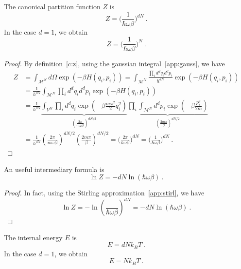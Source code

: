     The canonical partition function $Z$ is 
    \begin{equation}\label{harmz}
        Z = \Big (\frac{1}{\hbar \omega \beta} \Big )^{dN} ~.
    \end{equation}
    In the case $d = 1$, we obtain
    \begin{equation*}
        Z = \Big (\frac{1}{\hbar \omega \beta} \Big )^{N} ~.
    \end{equation*}
    \begin{proof}
        By definition~\eqref{c:z}, using the gaussian integral~\eqref{app:gauss}, we have
        \begin{equation*}
        \begin{aligned}
            Z & = \int_{\mathcal M^N} d\Omega \exp(- \beta H (q_i, p_i)) = \int_{\mathcal M^N} \frac{\prod_i d^d q_i d^d p_i}{h^{dN} } \exp(- \beta H (q_i, p_i)) \\ & = \frac{1}{h^{dN} } \int_{\mathcal M^N} \prod_i d^d q_i d^d p_i \exp(- \beta H (q_i, p_i)) \\ & = \frac{1}{h^{dN} } \underbrace{\int_{ V^N} \prod_i d^d q_i \exp(- \beta \frac{m \omega^2}{2} q_i^2)}_{(\frac{2 \pi}{m \omega \beta})^{dN/2}} \underbrace{\prod_i \int_{\mathcal M^N} d^d p_i \exp(- \beta \frac{p^2_i}{2m})}_{(\frac{2 m \pi}{\beta})^{dN/2}} \\ & = \frac{1}{h^{dN} } (\frac{2 \pi}{m \omega \beta})^{dN/2} (\frac{2 m \pi}{\beta})^{dN/2} = \Big (\frac{2\pi}{h \omega \beta} \Big )^{dN} = \Big (\frac{1}{\hbar \omega \beta} \Big )^{dN}~.
        \end{aligned}
        \end{equation*}
    \end{proof}
    An useful intermediary formula is 
    \begin{equation*}
        \ln Z = - d N \ln (\hbar \omega \beta) ~.
    \end{equation*}
    \begin{proof}
        In fact, using the Stirling approximation~\eqref{app:stirl}, we have
        \begin{equation*}
            \ln Z = - \ln (\frac{}{\hbar \omega \beta})^{dN} = - d N \ln (\hbar \omega \beta)  ~.
        \end{equation*}
    \end{proof}
    The internal energy $E$ is 
    \begin{equation*}
        E = d N k_B T ~.
    \end{equation*}
    In the case $d = 1$, we obtain 
    \begin{equation*}
        E = N k_B T~.
    \end{equation*}
